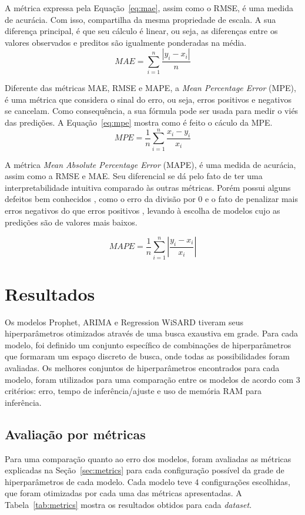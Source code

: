 A métrica expressa pela Equação~\ref{eq:mae}, assim como o RMSE, é uma medida de acurácia. Com isso, compartilha da mesma propriedade de escala. A sua diferença principal, é que seu cálculo é linear, ou seja, as diferenças entre os valores observados e preditos são igualmente ponderadas na média.
\begin{equation} \label{eq:mae}
    MAE=\sum ^{n}_{i=1}\dfrac{\left| y_{i}-x_{i}\right| }{n}
\end{equation}

Diferente das métricas MAE, RMSE e MAPE, a \textit{Mean Percentage Error} (MPE), é uma métrica que considera o sinal do erro, ou seja, erros positivos e negativos se cancelam. Como consequência, a sua fórmula pode ser usada para medir o viés das predições. A Equação~\ref{eq:mpe} mostra como é feito o cáculo da MPE.
\begin{equation} \label{eq:mpe}
    MPE=\dfrac{1}{n}\sum ^{n}_{i=1}\dfrac{x_{i}-y_{i}}{x_{i}}
\end{equation}

A métrica \textit{Mean Absolute Percentage Error} (MAPE), é uma medida de acurácia, assim como a RMSE e MAE. Seu diferencial se dá pelo fato de ter uma interpretabilidade intuitiva comparado às outras métricas. Porém possui alguns defeitos bem conhecidos \cite{CHRISTOFALLIS2015}, como o erro da divisão por 0 e o fato de penalizar mais erros negativos do que erros positivos \cite{MAKRIDAKIS1993527}, levando à escolha de modelos cujo as predições são de valores mais baixos.


\begin{equation} \label{eq:mape}
    MAPE=\dfrac{1}{n}\sum ^{n}_{i=1}\left| \dfrac{y_{i}-x_{i}}{x_{i}}\right|
\end{equation}

\section{Resultados}
Os modelos Prophet, ARIMA e Regression WiSARD tiveram seus hiperparâmetros otimizados através de uma busca exaustiva em grade. Para cada modelo, foi definido um conjunto específico de combinações de hiperparâmetros que formaram um espaço discreto de busca, onde todas as possibilidades foram avaliadas. Os melhores conjuntos de hiperparâmetros encontrados para cada modelo, foram utilizados para uma comparação entre os modelos de acordo com 3 critérios: erro, tempo de inferência/ajuste e uso de memória RAM para inferência.

\subsection{Avaliação por métricas}
Para uma comparação quanto ao erro dos modelos, foram avaliadas as métricas explicadas na Seção~\ref{sec:metrics} para cada configuração possível da grade de hiperparâmetros de cada modelo. Cada modelo teve 4 configurações escolhidas, que foram otimizadas por cada uma das métricas apresentadas. A Tabela~\ref{tab:metrics} mostra os resultados obtidos para cada \textit{dataset}.

